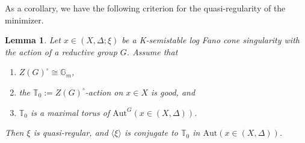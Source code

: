 \documentclass[12pt]{amsart}
\newtheorem{lem}[prop]{Lemma}
\theoremstyle{definition}
\newcommand{\bT}{\mathbb{T}}
\newcommand{\bG}{\mathbb{G}}
\newcommand{\Aut}{\mathrm{Aut}}
\numberwithin{equation}{section}
\begin{document}
As a corollary, we have the following criterion for the quasi-regularity of the minimizer.

\begin{lem} \label{lem:quasi-regular}
Let $x\in (X,\Delta;\xi)$ be a K-semistable log Fano cone singularity with the action of a reductive group $G$. Assume that
\begin{enumerate}
    \item $Z(G)^\circ\cong \bG_m$,
    \item the $\bT_0:=Z(G)^\circ$-action on $x\in X$ is good, and
    \item $\bT_0$ is a maximal torus of $\Aut^G(x\in (X,\Delta))$. %
\end{enumerate}
Then $\xi$ is quasi-regular, and $\langle\xi\rangle$ is conjugate to $\bT_0$ in $\Aut(x\in (X,\Delta))$.
\end{lem}

\end{document}
